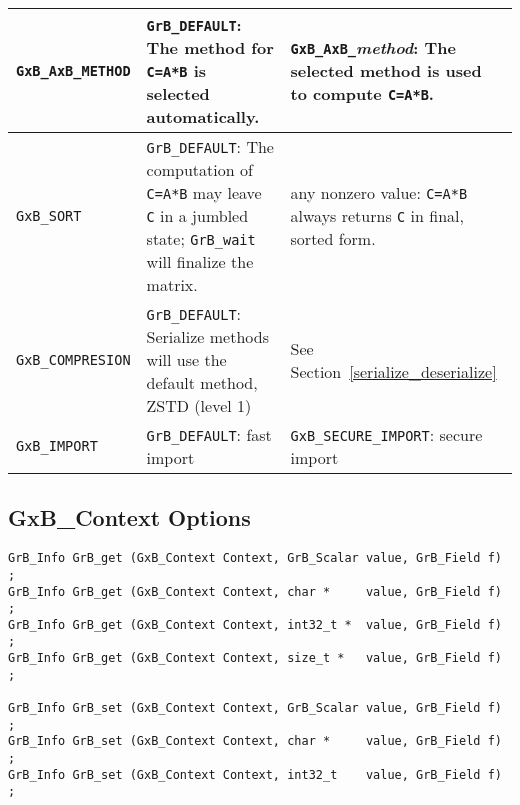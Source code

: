 {\begin{tabular}{|l|p{2.4in}|p{2.2in}|}
\verb'GxB_AxB_METHOD'
    & \verb'GrB_DEFAULT':
    The method for \verb'C=A*B' is selected automatically.
    & \verb'GxB_AxB_'{\em method}: The selected method is used to compute
    \verb'C=A*B'.  \\

\hline

\verb'GxB_SORT'
    & \verb'GrB_DEFAULT':
    The computation of \verb'C=A*B' may leave \verb'C' in a jumbled state;
    \verb'GrB_wait' will finalize the matrix.
    & any nonzero value: \verb'C=A*B' always returns \verb'C' in final,
    sorted form. \\

\hline

\verb'GxB_COMPRESION'
    & \verb'GrB_DEFAULT':
    Serialize methods will use the default method, ZSTD (level 1)
    & See Section~\ref{serialize_deserialize} \\

\hline

\verb'GxB_IMPORT'
    & \verb'GrB_DEFAULT': fast import
    & \verb'GxB_SECURE_IMPORT': secure import \\

\hline
\end{tabular}
}


\newpage
\subsection{{\sf GxB\_Context} Options}
\label{get_set_context}

\begin{mdframed}[userdefinedwidth=6in]
{\footnotesize
\begin{verbatim}
GrB_Info GrB_get (GxB_Context Context, GrB_Scalar value, GrB_Field f) ;
GrB_Info GrB_get (GxB_Context Context, char *     value, GrB_Field f) ;
GrB_Info GrB_get (GxB_Context Context, int32_t *  value, GrB_Field f) ;
GrB_Info GrB_get (GxB_Context Context, size_t *   value, GrB_Field f) ;

GrB_Info GrB_set (GxB_Context Context, GrB_Scalar value, GrB_Field f) ;
GrB_Info GrB_set (GxB_Context Context, char *     value, GrB_Field f) ;
GrB_Info GrB_set (GxB_Context Context, int32_t    value, GrB_Field f) ;
\end{verbatim}
}\end{mdframed}

